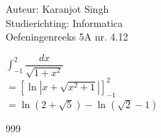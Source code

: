 \documentclass[a4paper]{article}
\begin{document}
\noindent \large Auteur: Karanjot Singh \\
\noindent \large Studierichting: Informatica \\
\noindent \large Oefeningenreeks 5A nr. 4.12 \\

\normalsize

$\displaystyle\int_{-1}^{2} \dfrac{dx}{\sqrt{1 + x^2}}$ \\

$= \left[\ln\left| x + \sqrt{x^2 + 1} \right|\right]_{-1}^{2}$ \\

$= \ln\left(2 + \sqrt{5}\right) - \ln\left(\sqrt{2} - 1\right)$ \\

\begin{thebibliography}{999}
\end{thebibliography}
\end{document}
